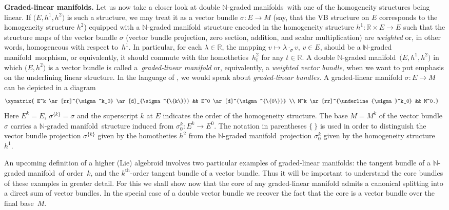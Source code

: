 \documentclass[10pt,a4paper]{amsart}
\newcommand{\grB}{{$\N$-graded manifold}}
\newcommand{\grBs}{{$\N$-graded manifolds}}
\newcommand{\degree}{{order}}
\newcommand{\thh}[1]{#1^{\mathrm{th}}} %
\newcommand{\R}{\mathbb{R}}
\newcommand{\N}{\mathbb{N}}
\newcommand{\ra}{\rightarrow}
\numberwithin{equation}{section}
\theoremstyle{definition}
\begin{document}
{\bf Graded-linear manifolds.}
 Let us now take a closer look at double \grBs\ with one of the homogeneity structures being linear. If $\big(E,h^1,h^2\big)$ is such a structure, we may treat it as a vector bundle $\sigma\colon E\ra M$ (say, that the VB structure on $E$ corresponds to the homogeneity structure $h^2$) equipped with a \grB\ structure encoded in the homogeneity structure $h^1\colon \R \times E\ra E$ such that the structure maps of the vector bundle $\sigma$ (vector bundle projection, zero section, addition, and scalar multiplication) are \emph{weighted} or, in other words, homogeneous with respect to~$h^1$. In particular, for each $\lambda\in \R$, the mapping $v \mapsto \lambda \cdot_{\sigma} v$, $v\in E$, should be a \grB\ morphism, or equivalently, it should commute with the homotheties~$h^2_t$ for any $t\in \R$. A double \grB\ $\big(E, h^1, h^2\big)$ in which $\big(E, h^2\big)$ is a vector bundle is called a~\emph{graded-linear manifold} or, equivalently, a \emph{weighted vector bundle}, when we want to put emphasis on the underlining linear structure. In the language of \cite{BGG}, we would speak about \emph{graded-linear bundles}. A graded-linear manifold $\sigma\colon E\ra M$ can be depicted in a diagram
\begin{gather}\label{d:gr_lin_bndl}\begin{split}&
\xymatrix{
E^k \ar[rr]^{\sigma^k_0} \ar[d]_{\sigma^{\{k\}}} && E^0 \ar[d]^{\sigma^{\{0\}}} \\
M^k \ar[rr]^{\underline{\sigma}^k_0} && M^0.}\end{split}
\end{gather}
Here $E^k = E$, $\sigma^{\{k\}} = \sigma$ and the superscript $k$ at $E$ indicates the order of the homogeneity structure. The base $M = M^k$ of the vector bundle $\sigma$ carries a \grB\ structure induced from $\sigma^k_0\colon E^k\ra E^0$. The notation in parentheses $\{ \ \}$ is used in order to distinguish the vector bundle projection $\sigma^{\{k\}}$ given by the homotheties $h^2$ from the \grB\ projection $\sigma^k_0$ given by the homogeneity structure~$h^1$.

An upcoming definition of a higher (Lie) algebroid involves two particular examples of graded-linear manifolds: the tangent bundle of a \grB\ of \degree\ $k$, and the $\thh{k}$-order tangent bundle of a vector bundle. Thus it will be important to understand the core bundles of these examples in greater detail. For this we shall show now that the core of any graded-linear manifold admits a canonical splitting into a direct sum of vector bundles. In the special case of a double vector bundle we recover the fact that the core is a vector bundle over the final base~$M$.
\end{document}
